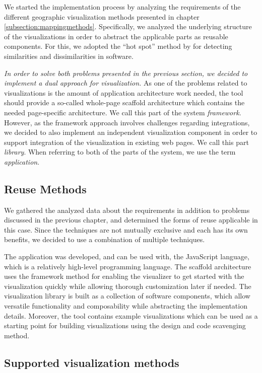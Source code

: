 We started the implementation process by analyzing the requirements of the different geographic visualization methods presented in chapter \ref{subsection:mappingmethods}. Specifically, we analyzed the underlying structure of the visualizations in order to abstract the applicable parts as reusable components. For this, we adopted the ``hot spot'' method by \citet{schmid_systematic_1997} for detecting similarities and dissimilarities in software.

\emph{In order to solve both problems presented in the previous section, we decided to implement a dual approach for visualization.} As one of the problems related to visualizations is the amount of application architecture work needed, the tool should provide a so-called whole-page scaffold architecture \citep{jazayeri_trends_2007} which contains the needed page-specific architecture. We call this part of the system \emph{framework}. However, as the framework approach involves challenges regarding integrations, we decided to also implement an independent visualization component in order to support integration of the visualization in existing web pages. We call this part \emph{library}. When referring to both of the parts of the system, we use the term \emph{application}.

\subsection{Reuse Methods}

We gathered the analyzed data about the requirements in addition to problems discussed in the previous chapter, and determined the forms of reuse applicable in this case. Since the techniques are not mutually exclusive and each has its own benefits, we decided to use a combination of multiple techniques. 

The application was developed, and can be used with, the JavaScript language, which is a relatively high-level programming language. The scaffold architecture uses the framework method for enabling the visualizer to get started with the visualization quickly while allowing thorough customization later if needed. The visualization library is built as a collection of software components, which allow versatile functionality and composability while abstracting the implementation details. Moreover, the tool contains example visualizations which can be used as a starting point for building visualizations using the design and code scavenging method.

\subsection{Supported visualization methods}
\label{subsection:supportedvisualizationmethods}

